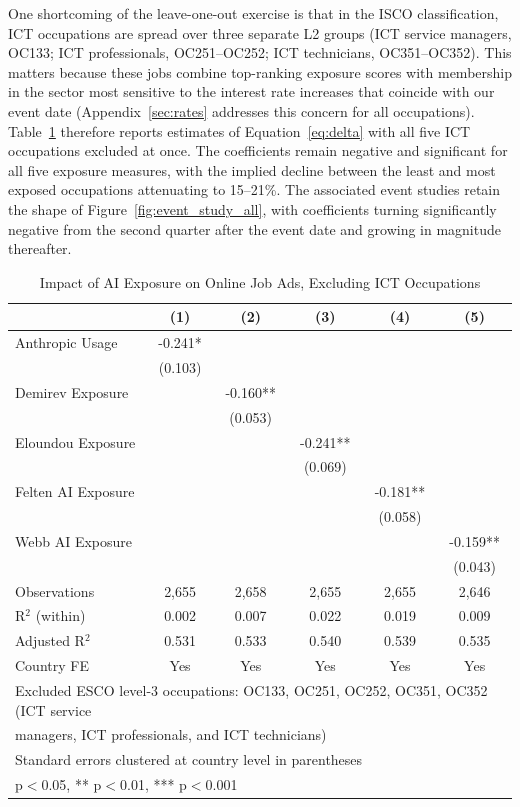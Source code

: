 \documentclass[11pt]{article}
\begin{document}
One shortcoming of the leave-one-out exercise is that in the ISCO classification, ICT occupations are spread over three separate L2 groups (ICT service managers, OC133; ICT professionals, OC251--OC252; ICT technicians, OC351--OC352). This matters because these jobs combine top-ranking exposure scores with membership in the sector most sensitive to the interest rate increases that coincide with our event date (Appendix~\ref{sec:rates} addresses this concern for all occupations). Table~\ref{table:delta_no_ict} therefore reports estimates of Equation~\ref{eq:delta} with all five ICT occupations excluded at once. The coefficients remain negative and significant for all five exposure measures, with the implied decline between the least and most exposed occupations attenuating to 15--21\%. The associated event studies retain the shape of Figure~\ref{fig:event_study_all}, with coefficients turning significantly negative from the second quarter after the event date and growing in magnitude thereafter.

\begin{table}[H]
\centering
\caption{Impact of AI Exposure on Online Job Ads, Excluding ICT Occupations}
\begin{tabular}{lccccc}
\hline\hline
 & (1) & (2) & (3) & (4) & (5) \\
\midrule
Anthropic Usage & -0.241* & & & & \\
 & (0.103) & & & & \\
Demirev Exposure & & -0.160** & & & \\
 & & (0.053) & & & \\
Eloundou Exposure & & & -0.241** & & \\
 & & & (0.069) & & \\
Felten AI Exposure & & & & -0.181** & \\
 & & & & (0.058) & \\
Webb AI Exposure & & & & & -0.159** \\
 & & & & & (0.043) \\
\midrule
Observations & 2,655 & 2,658 & 2,655 & 2,655 & 2,646 \\
R$^2$ (within) & 0.002 & 0.007 & 0.022 & 0.019 & 0.009 \\
Adjusted R$^2$ & 0.531 & 0.533 & 0.540 & 0.539 & 0.535 \\
Country FE & Yes & Yes & Yes & Yes & Yes \\
\hline\hline
\multicolumn{6}{l}{\footnotesize Excluded ESCO level-3 occupations: OC133, OC251, OC252, OC351, OC352 (ICT service} \\
\multicolumn{6}{l}{\footnotesize managers, ICT professionals, and ICT technicians)} \\
\multicolumn{6}{l}{\footnotesize Standard errors clustered at country level in parentheses} \\
\multicolumn{6}{l}{\footnotesize * p$<$0.05, ** p$<$0.01, *** p$<$0.001} \\
\end{tabular}
\label{table:delta_no_ict}
\end{table}
\end{document}
